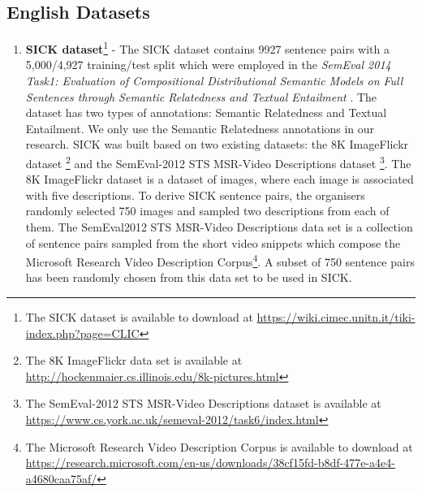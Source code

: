 \subsection{English Datasets}
\begin{enumerate}
  \item \textbf{SICK dataset}\footnote{The SICK dataset is available to download at \url{https://wiki.cimec.unitn.it/tiki-index.php?page=CLIC}} - The SICK dataset contains 9927 sentence pairs with a 5,000/4,927 training/test split which were employed in the \textit{SemEval 2014 Task1: Evaluation of Compositional Distributional Semantic Models on Full Sentences through Semantic Relatedness and Textual Entailment} \autocite{marelli-etal-2014-semeval}. The dataset has two types of annotations: Semantic Relatedness and Textual Entailment. We only use the Semantic Relatedness annotations in our research. SICK was built based on two existing datasets: the 8K ImageFlickr dataset \autocite{rashtchian-etal-2010-collecting}\footnote{The 8K ImageFlickr data set is available at \url{http://hockenmaier.cs.illinois.edu/8k-pictures.html}}  and the SemEval-2012 STS MSR-Video Descriptions dataset \autocite{agirre-etal-2012-semeval}\footnote{The SemEval-2012 STS MSR-Video Descriptions dataset is available at \url{https://www.cs.york.ac.uk/semeval-2012/task6/index.html}}. The 8K ImageFlickr dataset is a dataset of images, where each image is associated with five descriptions. To derive SICK sentence pairs, the organisers randomly selected 750 images and sampled two descriptions from each of them. The SemEval2012 STS MSR-Video Descriptions data set is a collection of sentence pairs sampled from the short video snippets which compose the Microsoft Research Video Description Corpus\footnote{The Microsoft Research Video Description Corpus is available to download at \url{https://research.microsoft.com/en-us/downloads/38cf15fd-b8df-477e-a4e4-a4680caa75af/}}. A subset of 750 sentence pairs has been randomly chosen from this data set to be used in SICK. 
  

\end{enumerate}
